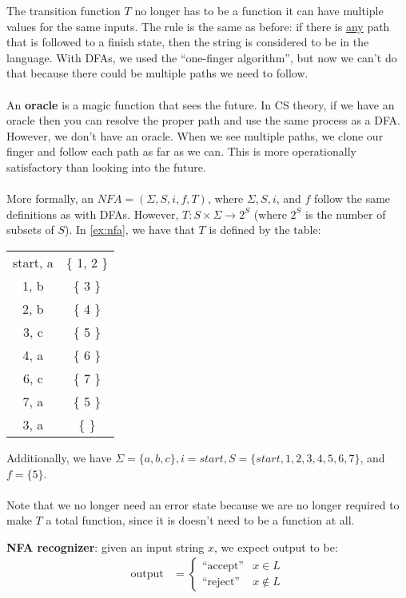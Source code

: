 \documentclass[]{article}
\theoremstyle{definition}
\begin{document}
				The transition function $T$ no longer has to be a function \textendash{} it can have multiple values for the same inputs.
				The rule is the same as before: if there is \underline{any} path that is followed to a finish state, then the string is considered to be in the language. With DFAs, we used the ``one-finger algorithm'', but now we can't do that because there could be multiple paths we need to follow.
				\\ \\
				An \textbf{oracle} is a magic function that sees the future. In CS theory, if we have an oracle then you can resolve the proper path and use the same process as a DFA. However, we don't have an oracle. When we see multiple paths, we clone our finger and follow each path as far as we can. This is more operationally satisfactory than looking into the future.
				\\ \\
				More formally, an $NFA = (\Sigma, S, i, f, T)$, where $\Sigma, S, i$, and $f$ follow the same definitions as with DFAs. However, $T: S \times \Sigma \to 2^S$ (where $2^S$ is the number of subsets of $S$). In \ref{ex:nfa}, we have that $T$ is defined by the table:
				\begin{center}
					\begin{tabular}{|c|c|}
						\hline
						start, a & \{ 1, 2 \} \\
						1, b & \{ 3 \} \\
						2, b & \{ 4 \} \\
						3, c & \{ 5 \} \\
						4, a & \{ 6 \} \\
						6, c & \{ 7 \} \\
						7, a & \{ 5 \} \\
						3, a & \{  \} \\ \hline
					\end{tabular}
				\end{center}
				Additionally, we have $\Sigma = \{a, b, c\}, i = start, S = \{start, 1, 2, 3, 4, 5, 6, 7\}$, and $f = \{ 5 \}$.
				\\ \\
				Note that we no longer need an error state because we are no longer required to make $T$ a total function, since it is doesn't need to be a function at all. 
					
				\textbf{NFA recognizer}: given an input string $x$, we expect output to be:
				\begin{align*}
					\text{output} &= \begin{cases}
						\text{``accept''} & x \in L \\
						\text{``reject''} & x \not \in L
					\end{cases}
				\end{align*}
\end{document}

